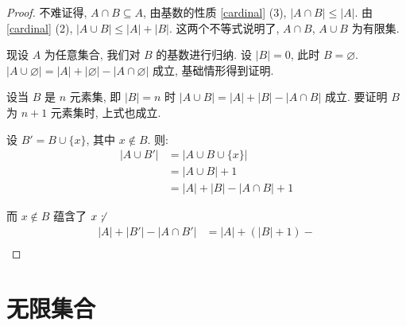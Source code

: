 \documentclass[UTF8]{ctexart}
\theoremstyle{mystyle}
\theoremstyle{myremark}
\theoremstyle{plain}
\newcommand{\set}[1]{\{#1\}}
\begin{document}
\begin{proof}
    不难证得, $ A \cap B \subseteq A $, 由基数的性质 \ref{cardinal} (3), $ |A \cap B| \leqslant |A| $. 由 \ref{cardinal} (2), $ |A \cup B| \leqslant |A| + |B| $. 这两个不等式说明了, $ A \cap B $, $ A \cup B $ 为有限集.

    现设 $ A $ 为任意集合, 我们对 $ B $ 的基数进行归纳. 设 $ |B| = 0 $, 此时 $ B = \varnothing $. $ |A \cup \varnothing| = |A| + |\varnothing| - |A \cap \varnothing| $ 成立, 基础情形得到证明.

    设当 $ B $ 是 $ n $ 元素集, 即 $ |B| = n $ 时 $ |A \cup B| = |A| + |B| - |A \cap B| $ 成立. 要证明 $ B $ 为 $ n + 1 $ 元素集时, 上式也成立.

    设 $ B' = B \cup \set{x} $, 其中 $ x \notin B $. 则:
    \begin{align*}
        |A \cup B'| &= |A \cup B \cup \set{x}| \\
        &= |A \cup B| + 1 \\
        &= |A| + |B| - |A \cap B| + 1
    \end{align*}

    而 $ x \notin B $ 蕴含了 $ x \not $:
    \begin{align*}
        |A| + |B'| - |A \cap B'| &= |A| + (|B| + 1) -  \\
    \end{align*}
\end{proof}




\section{无限集合}
\end{document}
